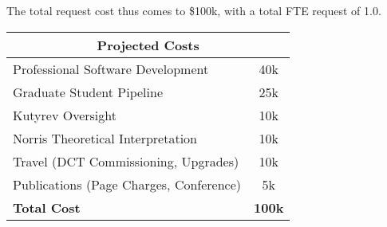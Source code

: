 \documentclass[letterpaper,11pt]{article}
\begin{document}
The total request cost thus comes to \$100k, with a total FTE request of 1.0.

\smallskip

\begin{center}
\begin{tabular}{lc}
\multicolumn{2}{c}{\textbf{Projected Costs}} \\
\hline
Professional Software Development & 40k \\
Graduate Student Pipeline & 25k \\
Kutyrev Oversight & 10k \\
Norris Theoretical Interpretation & 10k \\
Travel (DCT Commissioning, Upgrades) & 10k \\
Publications (Page Charges, Conference) & 5k \\
\hline
\textbf{Total Cost} & \textbf{100k} \\
\end{tabular}
\end{center}
\end{document}
